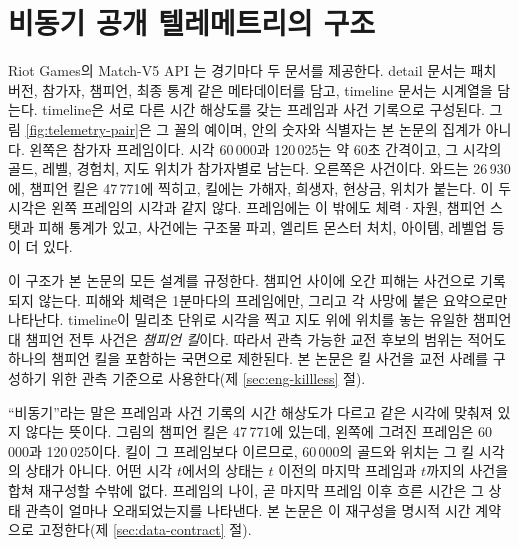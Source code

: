 \section{비동기 공개 텔레메트리의 구조}
\label{sec:data-telemetry}

Riot Games의 Match-V5 API \cite{riotapi2024matchv5,riotapi2024timeline}는 경기마다 두 문서를 제공한다. detail 문서는 패치 버전, 참가자, 챔피언, 최종 통계 같은 메타데이터를 담고, timeline 문서는 시계열을 담는다. timeline은 서로 다른 시간 해상도를 갖는 프레임과 사건 기록으로 구성된다. 그림 \ref{fig:telemetry-pair}은 그 꼴의 예이며, 안의 숫자와 식별자는 본 논문의 집계가 아니다. 왼쪽은 참가자 프레임이다. 시각 60\,000과 120\,025는 약 60초 간격이고, 그 시각의 골드, 레벨, 경험치, 지도 위치가 참가자별로 남는다. 오른쪽은 사건이다. 와드는 26\,930에, 챔피언 킬은 47\,771에 찍히고, 킬에는 가해자, 희생자, 현상금, 위치가 붙는다. 이 두 시각은 왼쪽 프레임의 시각과 같지 않다. 프레임에는 이 밖에도 체력·자원, 챔피언 스탯과 피해 통계가 있고, 사건에는 구조물 파괴, 엘리트 몬스터 처치, 아이템, 레벨업 등이 더 있다.



이 구조가 본 논문의 모든 설계를 규정한다. 챔피언 사이에 오간 피해는 사건으로 기록되지 않는다. 피해와 체력은 1분마다의 프레임에만, 그리고 각 사망에 붙은 요약으로만 나타난다. timeline이 밀리초 단위로 시각을 찍고 지도 위에 위치를 놓는 유일한 챔피언 대 챔피언 전투 사건은 \emph{챔피언 킬}이다. 따라서 관측 가능한 교전 후보의 범위는 적어도 하나의 챔피언 킬을 포함하는 국면으로 제한된다. 본 논문은 킬 사건을 교전 사례를 구성하기 위한 관측 기준으로 사용한다(제 \ref{sec:eng-killless} 절).

``비동기''라는 말은 프레임과 사건 기록의 시간 해상도가 다르고 같은 시각에 맞춰져 있지 않다는 뜻이다. 그림의 챔피언 킬은 47\,771에 있는데, 왼쪽에 그려진 프레임은 60\,000과 120\,025이다. 킬이 그 프레임보다 이르므로, 60\,000의 골드와 위치는 그 킬 시각의 상태가 아니다. 어떤 시각 $t$에서의 상태는 $t$ 이전의 마지막 프레임과 $t$까지의 사건을 합쳐 재구성할 수밖에 없다. 프레임의 나이, 곧 마지막 프레임 이후 흐른 시간은 그 상태 관측이 얼마나 오래되었는지를 나타낸다. 본 논문은 이 재구성을 명시적 시간 계약으로 고정한다(제 \ref{sec:data-contract} 절).
